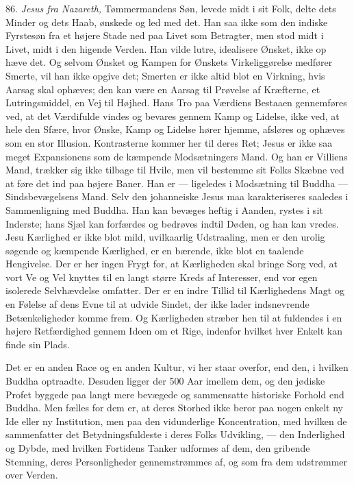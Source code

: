 \documentclass[12pt,a4paper,openany]{book}
\newcommand{\opage}[1]{\marginnote{\footnotesize\textit{[#1]}}}
\begin{document}
86. \textit{Jesus fra Nazareth,} Tømmermandens Søn, levede midt i sit
Folk, delte dets Minder og dets Haab, ønskede og led med det. Han saa
ikke som den indiske Fyrstesøn fra et højere Stade ned paa Livet som
Betragter, men stod midt i Livet, midt i den higende Verden. Han vilde
lutre, idealisere Ønsket, ikke op%
\opage{199}hæve det. Og selvom Ønsket og Kampen for Ønskets
Virkeliggørelse medfører Smerte, vil han ikke opgive det; Smerten er
ikke altid blot en Virkning, hvis Aarsag skal ophæves; den kan være en
Aarsag til Prøvelse af Kræfterne, et Lutringsmiddel, en Vej til Højhed.
Hans Tro paa Værdiens Bestaaen gennemføres ved, at det Værdifulde vindes
og bevares gennem Kamp og Lidelse, ikke ved, at hele den Sfære, hvor
Ønske, Kamp og Lidelse hører hjemme, afsløres og ophæves som en stor
Illusion. Kontrasterne kommer her til deres Ret; Jesus er ikke saa meget
Expansionens som de kæmpende Modsætningers Mand. Og han er Villiens
Mand, trækker sig ikke tilbage til Hvile, men vil bestemme sit Folks
Skæbne ved at føre det ind paa højere Baner. Han er --- ligeledes i
Modsætning til Buddha --- Sindsbevægelsens Mand. Selv den johanneiske
Jesus maa karakteriseres saaledes i Sammenligning med Buddha. Han kan
bevæges heftig i Aanden, rystes i sit Inderste; hans Sjæl kan forfærdes
og bedrøves indtil Døden, og han kan vredes. Jesu Kærlighed er ikke blot
mild, uvilkaarlig Udstraaling, men er den urolig søgende og kæmpende
Kærlighed, er en bærende, ikke blot en taalende Hengivelse. Der er her
ingen Frygt for, at Kærligheden skal bringe Sorg ved, at vort Ve og Vel
knyttes til en langt større Kreds af Interesser, end vor egen isolerede
Selvhævdelse omfatter. Der er en indre Tillid til Kærlighedens Magt og
en Følelse af dens Evne til at udvide Sindet, der ikke lader
indsnevrende Betænkeligheder komme frem. Og Kærligheden stræber hen til
at fuldendes i en højere Retfærdighed gennem Ideen om et Rige, indenfor
hvilket hver Enkelt kan finde sin Plads.

Det er en anden Race og en anden Kultur, vi her staar overfor, end den,
i hvilken Buddha optraadte. Desuden ligger der 500 Aar imellem dem, og
den jødiske Profet byggede paa langt mere bevægede og sammensatte
historiske Forhold end Buddha. Men fælles for dem er, at deres Storhed
ikke beror paa nogen enkelt ny Ide eller ny Institution, men paa den
vidunderlige Koncentration, med hvilken de sammenfatter det
Betydningsfuldeste i deres Folks Udvikling, --- den Inderlighed og
Dybde, med hvilken Fortidens Tanker udformes af dem, den gribende
Stemning, deres Personligheder gennemstrømmes af, og som fra dem
udstrømmer over Verden.
\end{document}
